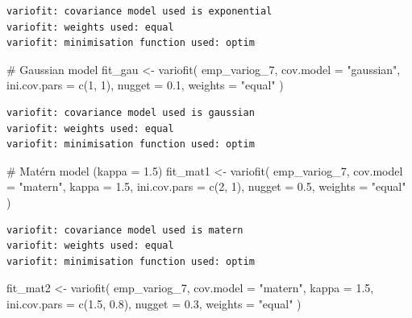 \documentclass[
  11pt,
]{article}
\newenvironment{Shaded}{\begin{snugshade}}{\end{snugshade}}
\newcommand{\AttributeTok}[1]{\textcolor[rgb]{0.40,0.45,0.13}{#1}}
\newcommand{\CommentTok}[1]{\textcolor[rgb]{0.37,0.37,0.37}{#1}}
\newcommand{\DecValTok}[1]{\textcolor[rgb]{0.68,0.00,0.00}{#1}}
\newcommand{\FloatTok}[1]{\textcolor[rgb]{0.68,0.00,0.00}{#1}}
\newcommand{\FunctionTok}[1]{\textcolor[rgb]{0.28,0.35,0.67}{#1}}
\newcommand{\NormalTok}[1]{\textcolor[rgb]{0.00,0.23,0.31}{#1}}
\newcommand{\OtherTok}[1]{\textcolor[rgb]{0.00,0.23,0.31}{#1}}
\newcommand{\StringTok}[1]{\textcolor[rgb]{0.13,0.47,0.30}{#1}}
\begin{document}
\begin{verbatim}
variofit: covariance model used is exponential 
variofit: weights used: equal 
variofit: minimisation function used: optim 
\end{verbatim}

\begin{Shaded}
\begin{Highlighting}[]
\CommentTok{\# Gaussian model}
\NormalTok{fit\_gau }\OtherTok{\textless{}{-}} \FunctionTok{variofit}\NormalTok{(}
\NormalTok{  emp\_variog\_7,}
  \AttributeTok{cov.model =} \StringTok{"gaussian"}\NormalTok{,}
  \AttributeTok{ini.cov.pars =} \FunctionTok{c}\NormalTok{(}\DecValTok{1}\NormalTok{, }\DecValTok{1}\NormalTok{),}
  \AttributeTok{nugget =} \FloatTok{0.1}\NormalTok{,}
  \AttributeTok{weights =} \StringTok{"equal"}
\NormalTok{)}
\end{Highlighting}
\end{Shaded}

\begin{verbatim}
variofit: covariance model used is gaussian 
variofit: weights used: equal 
variofit: minimisation function used: optim 
\end{verbatim}

\begin{Shaded}
\begin{Highlighting}[]
\CommentTok{\# Matérn model (kappa = 1.5)}
\NormalTok{fit\_mat1 }\OtherTok{\textless{}{-}} \FunctionTok{variofit}\NormalTok{(}
\NormalTok{  emp\_variog\_7,}
  \AttributeTok{cov.model =} \StringTok{"matern"}\NormalTok{,}
  \AttributeTok{kappa =} \FloatTok{1.5}\NormalTok{,}
  \AttributeTok{ini.cov.pars =} \FunctionTok{c}\NormalTok{(}\DecValTok{2}\NormalTok{, }\DecValTok{1}\NormalTok{),}
  \AttributeTok{nugget =} \FloatTok{0.5}\NormalTok{,}
  \AttributeTok{weights =} \StringTok{"equal"}
\NormalTok{)}
\end{Highlighting}
\end{Shaded}

\begin{verbatim}
variofit: covariance model used is matern 
variofit: weights used: equal 
variofit: minimisation function used: optim 
\end{verbatim}

\begin{Shaded}
\begin{Highlighting}[]
\NormalTok{fit\_mat2 }\OtherTok{\textless{}{-}} \FunctionTok{variofit}\NormalTok{(}
\NormalTok{  emp\_variog\_7,}
  \AttributeTok{cov.model =} \StringTok{"matern"}\NormalTok{,}
  \AttributeTok{kappa =} \FloatTok{1.5}\NormalTok{,}
  \AttributeTok{ini.cov.pars =} \FunctionTok{c}\NormalTok{(}\FloatTok{1.5}\NormalTok{, }\FloatTok{0.8}\NormalTok{),}
  \AttributeTok{nugget =} \FloatTok{0.3}\NormalTok{,}
  \AttributeTok{weights =} \StringTok{"equal"}
\NormalTok{)}
\end{Highlighting}
\end{Shaded}
\end{document}
